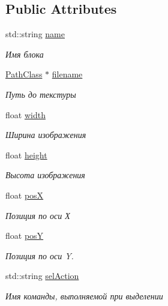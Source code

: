 \subsection*{Public Attributes}
\begin{DoxyCompactItemize}
\item 
std\+::string \hyperlink{struct_interface_element_class_1_1_bitmap_info_ab9ecbd2b19cbd37086bd0c6c6da20763}{name}
\begin{DoxyCompactList}\small\item\em Имя блока \end{DoxyCompactList}\item 
\hyperlink{class_path_class}{Path\+Class} $\ast$ \hyperlink{struct_interface_element_class_1_1_bitmap_info_abccd67845c92a9c8d3ee9c22e516f18a}{filename}
\begin{DoxyCompactList}\small\item\em Путь до текстуры \end{DoxyCompactList}\item 
float \hyperlink{struct_interface_element_class_1_1_bitmap_info_a52ecdc4352e94105a1c5203e06f5ebde}{width}
\begin{DoxyCompactList}\small\item\em Ширина изображения \end{DoxyCompactList}\item 
float \hyperlink{struct_interface_element_class_1_1_bitmap_info_abdc9279e8678b456b6dfac0438d742b6}{height}
\begin{DoxyCompactList}\small\item\em Высота изображения \end{DoxyCompactList}\item 
float \hyperlink{struct_interface_element_class_1_1_bitmap_info_a1fdd70f96bff253241dd0e05856b62d5}{posX}
\begin{DoxyCompactList}\small\item\em Позиция по оси Х \end{DoxyCompactList}\item 
float \hyperlink{struct_interface_element_class_1_1_bitmap_info_aa2709caed1ab94f8d1a6934265c1f3aa}{posY}
\begin{DoxyCompactList}\small\item\em Позиция по оси Y. \end{DoxyCompactList}\item 
std\+::string \hyperlink{struct_interface_element_class_1_1_bitmap_info_abe96b0fb1a1fcd2469f03db1fcc03f30}{sel\+Action}
\begin{DoxyCompactList}\small\item\em Имя команды, выполняемой при выделении \end{DoxyCompactList}\item 

\end{DoxyCompactItemize}
